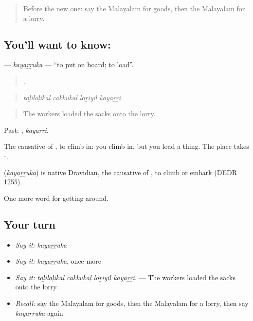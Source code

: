 \begin{quote}
Before the new one: say the Malayalam for goods, then the Malayalam for a lorry.
\end{quote}

\subsection*{You'll want to know: }
\textbf{} — \emph{kayaṟṟuka} — \textquotedblleft{}to put on board; to load\textquotedblright{}.

\begin{quote}
   .
\end{quote}

\begin{quote}
\emph{toḻilāḷikaḷ cākkukaḷ lōṟiyil kayaṟṟi.}
\end{quote}

\begin{quote}
The workers loaded the sacks onto the lorry.
\end{quote}

Past: , \emph{kayaṟṟi}.

The causative of , to climb in: you climb in, but you load a thing. The place takes -.

\begin{cousinweb}
\textbf{} (\emph{kayaṟṟuka}) is native Dravidian, the causative of , to climb or embark (DEDR 1255).
\end{cousinweb}

\begin{grammarlens}[title={What you've built}]
One more word for getting around.
\end{grammarlens}

\subsection*{Your turn}
\begin{itemize}
\raggedright
  \item \emph{Say it:} \emph{kayaṟṟuka}
  \item \emph{Say it:} \emph{kayaṟṟuka}, once more
  \item \emph{Say it:} \emph{toḻilāḷikaḷ cākkukaḷ lōṟiyil kayaṟṟi.} — The workers loaded the sacks onto the lorry.
  \item \emph{Recall:} say the Malayalam for goods, then the Malayalam for a lorry, then say \emph{kayaṟṟuka} again
\end{itemize}

